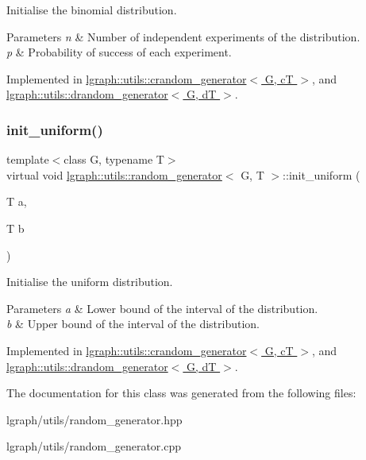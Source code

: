 Initialise the binomial distribution. 


\begin{DoxyParams}{Parameters}
{\em n} & Number of independent experiments of the distribution. \\
\hline
{\em p} & Probability of success of each experiment. \\
\hline
\end{DoxyParams}


Implemented in \hyperlink{classlgraph_1_1utils_1_1crandom__generator_a4d7042cb0862c3b8b4792890e6c5388c}{lgraph\+::utils\+::crandom\+\_\+generator$<$ G, c\+T $>$}, and \hyperlink{classlgraph_1_1utils_1_1drandom__generator_acae17810176a40fdfd8a4a260892361e}{lgraph\+::utils\+::drandom\+\_\+generator$<$ G, d\+T $>$}.

\mbox{\label{classlgraph_1_1utils_1_1random__generator_a129da597bed5b08e9c7e5a3ddce4287c}} 
\subsubsection{\texorpdfstring{init\+\_\+uniform()}{init\_uniform()}}
{\footnotesize\ttfamily template$<$class G, typename T$>$ \\
virtual void \hyperlink{classlgraph_1_1utils_1_1random__generator}{lgraph\+::utils\+::random\+\_\+generator}$<$ G, T $>$\+::init\+\_\+uniform (\begin{DoxyParamCaption}\item[{T}]{a,  }\item[{T}]{b }\end{DoxyParamCaption})\hspace{0.3cm}{\ttfamily [pure virtual]}}



Initialise the uniform distribution. 


\begin{DoxyParams}{Parameters}
{\em a} & Lower bound of the interval of the distribution. \\
\hline
{\em b} & Upper bound of the interval of the distribution. \\
\hline
\end{DoxyParams}


Implemented in \hyperlink{classlgraph_1_1utils_1_1crandom__generator_addfa5951276296b2a164e5dc482728ce}{lgraph\+::utils\+::crandom\+\_\+generator$<$ G, c\+T $>$}, and \hyperlink{classlgraph_1_1utils_1_1drandom__generator_a38c5b5c981d635aac32f632a0f4a0092}{lgraph\+::utils\+::drandom\+\_\+generator$<$ G, d\+T $>$}.



The documentation for this class was generated from the following files\+:\begin{DoxyCompactItemize}
\item 
lgraph/utils/random\+\_\+generator.\+hpp\item 
lgraph/utils/random\+\_\+generator.\+cpp\end{DoxyCompactItemize}
